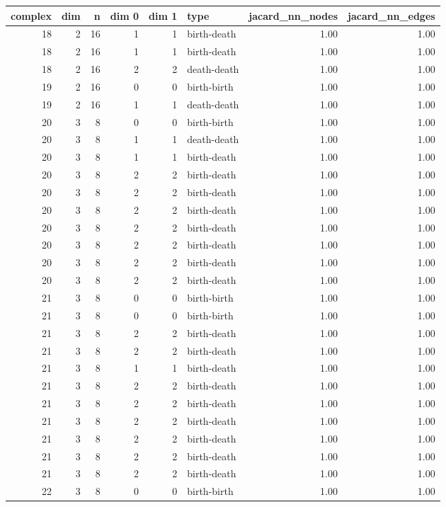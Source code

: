 \documentclass{article}
\begin{document}
\begin{center}
\begin{tabular}{rrrrrlrr}
\toprule
complex & dim & n & dim 0 & dim 1 & type & jacard\_nn\_nodes & jacard\_nn\_edges \\
\midrule
18 & 2 & 16 & 1 & 1 & birth-death & 1.00 & 1.00 \\
18 & 2 & 16 & 1 & 1 & birth-death & 1.00 & 1.00 \\
18 & 2 & 16 & 2 & 2 & death-death & 1.00 & 1.00 \\
19 & 2 & 16 & 0 & 0 & birth-birth & 1.00 & 1.00 \\
19 & 2 & 16 & 1 & 1 & death-death & 1.00 & 1.00 \\
20 & 3 & 8 & 0 & 0 & birth-birth & 1.00 & 1.00 \\
20 & 3 & 8 & 1 & 1 & death-death & 1.00 & 1.00 \\
20 & 3 & 8 & 1 & 1 & birth-death & 1.00 & 1.00 \\
20 & 3 & 8 & 2 & 2 & birth-death & 1.00 & 1.00 \\
20 & 3 & 8 & 2 & 2 & birth-death & 1.00 & 1.00 \\
20 & 3 & 8 & 2 & 2 & birth-death & 1.00 & 1.00 \\
20 & 3 & 8 & 2 & 2 & birth-death & 1.00 & 1.00 \\
20 & 3 & 8 & 2 & 2 & birth-death & 1.00 & 1.00 \\
20 & 3 & 8 & 2 & 2 & birth-death & 1.00 & 1.00 \\
20 & 3 & 8 & 2 & 2 & birth-death & 1.00 & 1.00 \\
21 & 3 & 8 & 0 & 0 & birth-birth & 1.00 & 1.00 \\
21 & 3 & 8 & 0 & 0 & birth-birth & 1.00 & 1.00 \\
21 & 3 & 8 & 2 & 2 & birth-death & 1.00 & 1.00 \\
21 & 3 & 8 & 2 & 2 & birth-death & 1.00 & 1.00 \\
21 & 3 & 8 & 1 & 1 & birth-death & 1.00 & 1.00 \\
21 & 3 & 8 & 2 & 2 & birth-death & 1.00 & 1.00 \\
21 & 3 & 8 & 2 & 2 & birth-death & 1.00 & 1.00 \\
21 & 3 & 8 & 2 & 2 & birth-death & 1.00 & 1.00 \\
21 & 3 & 8 & 2 & 2 & birth-death & 1.00 & 1.00 \\
21 & 3 & 8 & 2 & 2 & birth-death & 1.00 & 1.00 \\
21 & 3 & 8 & 2 & 2 & birth-death & 1.00 & 1.00 \\
22 & 3 & 8 & 0 & 0 & birth-birth & 1.00 & 1.00 \\

\end{tabular}
\end{center}
\end{document}
